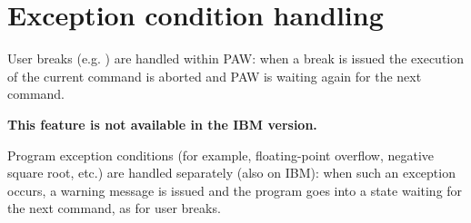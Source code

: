 \section{Exception condition handling}



User breaks (e.g. ) are handled within PAW:
when a break is issued the execution of the current command
is aborted and PAW is waiting again for the next command.

{\bf This feature is not available in the IBM version.}

Program exception conditions (for example, floating-point overflow,
negative square root, etc.) are handled separately (also on IBM):
when such an exception occurs, a warning message is issued and
the program goes into a state waiting for the next command,
as for user breaks.
%

